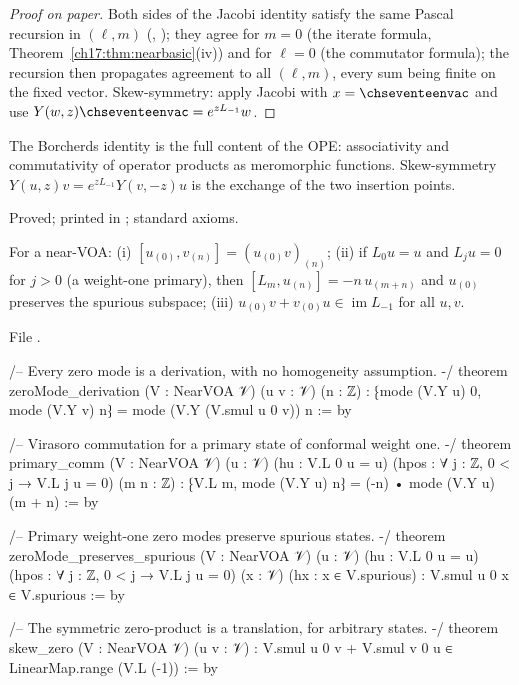 \begin{proof}[Proof on paper]
Both sides of the Jacobi identity satisfy the same Pascal recursion in $(\ell,m)$
(, ); they agree for $m=0$ (the iterate formula,
Theorem~\ref{ch17:thm:nearbasic}(iv)) and for $\ell=0$ (the commutator formula); the recursion then propagates agreement
to all $(\ell,m)$, every sum being finite on the fixed vector.  Skew-symmetry: apply Jacobi with $x=\chseventeenvac$ and use
$Y(w,z)\chseventeenvac=e^{zL_{-1}}w$.
\end{proof}

\begin{physics}
The Borcherds identity is the full content of the OPE: associativity and commutativity of operator products as
meromorphic functions.  Skew-symmetry $Y(u,z)v=e^{zL_{-1}}Y(v,-z)u$ is the exchange of the two insertion points.
\end{physics}

\begin{status}
Proved; printed in ; standard axioms.
\end{status}

\begin{theorem}\label{ch17:thm:nearconseq}
For a near-VOA: (i) $[u_{(0)},v_{(n)}]=(u_{(0)}v)_{(n)}$; (ii) if $L_0u=u$ and $L_ju=0$ for $j>0$ (a weight-one primary),
then $[L_m,u_{(n)}]=-n\,u_{(m+n)}$ and $u_{(0)}$ preserves the spurious subspace; (iii) $u_{(0)}v+v_{(0)}u\in\operatorname{im}L_{-1}$
for all $u,v$.
\end{theorem}

\noindent File .
\begin{leancode}
/-- Every zero mode is a derivation, with no homogeneity assumption. -/
theorem zeroMode_derivation (V : NearVOA 𝒱) (u v : 𝒱) (n : ℤ) :
    ⁅mode (V.Y u) 0, mode (V.Y v) n⁆ = mode (V.Y (V.smul u 0 v)) n := by

/-- Virasoro commutation for a primary state of conformal weight one. -/
theorem primary_comm (V : NearVOA 𝒱) (u : 𝒱) (hu : V.L 0 u = u)
    (hpos : ∀ j : ℤ, 0 < j → V.L j u = 0) (m n : ℤ) :
    ⁅V.L m, mode (V.Y u) n⁆ = (-n) • mode (V.Y u) (m + n) := by

/-- Primary weight-one zero modes preserve spurious states. -/
theorem zeroMode_preserves_spurious (V : NearVOA 𝒱) (u : 𝒱) (hu : V.L 0 u = u)
    (hpos : ∀ j : ℤ, 0 < j → V.L j u = 0) (x : 𝒱) (hx : x ∈ V.spurious) :
    V.smul u 0 x ∈ V.spurious := by

/-- The symmetric zero-product is a translation, for arbitrary states. -/
theorem skew_zero (V : NearVOA 𝒱) (u v : 𝒱) :
    V.smul u 0 v + V.smul v 0 u ∈ LinearMap.range (V.L (-1)) := by
\end{leancode}

